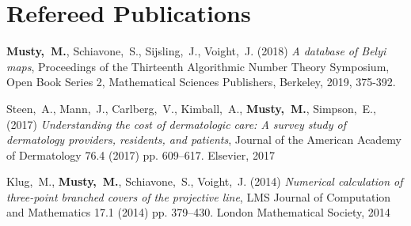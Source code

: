 
\section{\sc Refereed Publications}
\addtocounter{pubCounter}{-1}
\begin{etaremune}[start=\value{pubCounter}]
\item
  {\bf Musty,~M.},
  Schiavone,~S., Sijsling,~J., Voight,~J.
  (2018)
  {\it A database of Belyi maps},
  Proceedings of the Thirteenth Algorithmic Number Theory Symposium, Open Book Series 2, Mathematical Sciences Publishers, Berkeley, 2019, 375-392.
\item
  Steen,~A.,
  Mann,~J.,
  Carlberg,~V.,
  Kimball,~A.,
  {\bf Musty,~M.},
  Simpson,~E.,
  (2017)
  {\it Understanding the cost of dermatologic care: A survey study of dermatology providers, residents, and patients},
  Journal of the American Academy of Dermatology 76.4 (2017) pp. 609–617. Elsevier, 2017
\item
  Klug,~M.,
  {\bf Musty,~M.},
  Schiavone,~S., Voight,~J.
  (2014)
  {\it Numerical calculation of three-point branched covers of the projective line},
  LMS Journal of Computation and Mathematics 17.1 (2014) pp. 379–430. London Mathematical Society, 2014
\end{etaremune}

